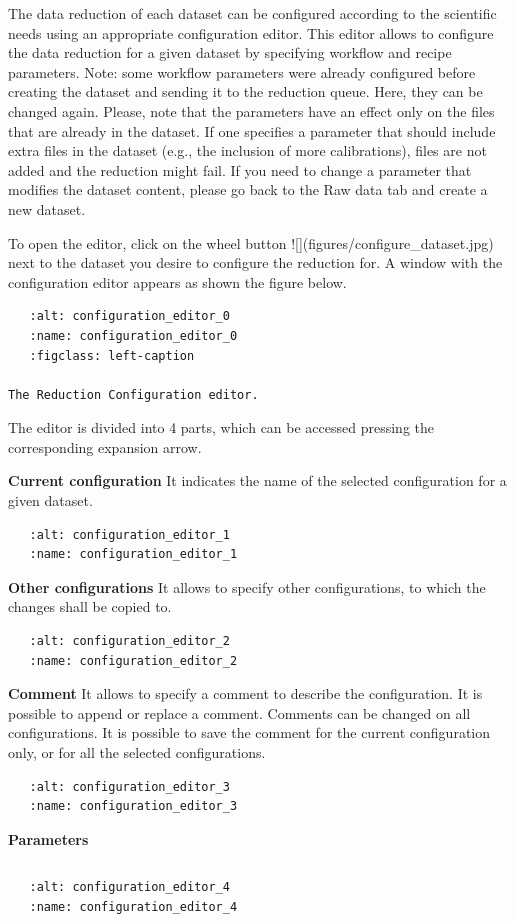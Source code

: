 \documentclass{article}
\begin{document}
            The data reduction of each dataset can be configured according to the scientific needs using an appropriate configuration editor.
This editor allows to configure the data reduction for a given dataset by specifying workflow and recipe
parameters.
Note: some workflow parameters were already configured before creating the dataset and sending it to the reduction queue.
Here, they can be changed again. Please, note that the parameters have an effect only on the files that are already in the dataset. 
If one specifies a parameter that should include extra files in the dataset (e.g., the inclusion of more calibrations), files are not added and the reduction might fail. 
If you need to change a parameter that modifies the dataset content, please go back to the Raw data tab and create a new dataset.

To open the editor, click on
the wheel button ![](figures/configure_dataset.jpg) next to the dataset you desire to configure the reduction for. A window with the
configuration editor appears as shown the figure below.

\begin{verbatim}
   :alt: configuration_editor_0
   :name: configuration_editor_0
   :figclass: left-caption

The Reduction Configuration editor.
\end{verbatim}

The editor is divided into 4 parts, which can be accessed pressing the corresponding expansion arrow. 

\textbf{Current configuration} It indicates the name of the selected configuration for a given dataset.
\begin{verbatim}
   :alt: configuration_editor_1
   :name: configuration_editor_1
\end{verbatim}
\textbf{Other configurations} It allows to specify other configurations, to which the changes shall be copied to.
\begin{verbatim}
   :alt: configuration_editor_2
   :name: configuration_editor_2
\end{verbatim}
\textbf{Comment} It allows to specify a comment to describe the configuration. It is possible to append or replace a comment.
Comments can be changed on all configurations. It is possible to save the comment for the current configuration only, or for all
the selected configurations.

\begin{verbatim}
   :alt: configuration_editor_3
   :name: configuration_editor_3
\end{verbatim}
\textbf{Parameters}

\begin{verbatim}
\end{verbatim}

\begin{verbatim}
   :alt: configuration_editor_4
   :name: configuration_editor_4
\end{verbatim}






            
\end{document}
